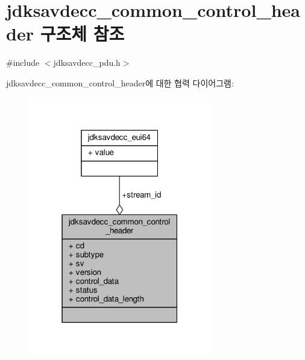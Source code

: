 \hypertarget{structjdksavdecc__common__control__header}{}\section{jdksavdecc\+\_\+common\+\_\+control\+\_\+header 구조체 참조}
\label{structjdksavdecc__common__control__header}


{\ttfamily \#include $<$jdksavdecc\+\_\+pdu.\+h$>$}



jdksavdecc\+\_\+common\+\_\+control\+\_\+header에 대한 협력 다이어그램\+:
\nopagebreak
\begin{figure}[H]
\begin{center}
\leavevmode
\includegraphics[width=223pt]{structjdksavdecc__common__control__header__coll__graph}
\end{center}
\end{figure}
